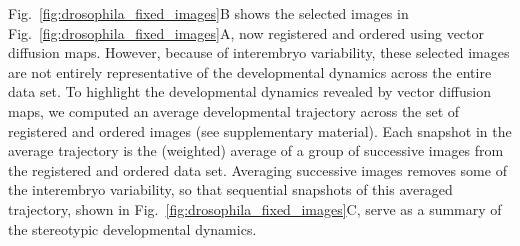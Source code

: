 \documentclass[twocolumn, 10pt]{article}
\newcommand{\SI}[0]{supplementary material}
\newcommand{\fig}[0]{Fig.}
\begin{document}
\fig~\ref{fig:drosophila_fixed_images}B shows the selected images in \fig~\ref{fig:drosophila_fixed_images}A, now registered and ordered using vector diffusion maps.
%
However, because of interembryo variability, these selected images are not entirely representative of the developmental dynamics across the entire data set.
%
To highlight the developmental dynamics revealed by vector diffusion maps, we computed an average developmental trajectory across the set of registered and ordered images (see \SI).
%
Each snapshot in the average trajectory is the (weighted) average of a group of successive images from the registered and ordered data set.
%
Averaging successive images removes some of the interembryo variability, so that sequential snapshots of this averaged trajectory, shown in \fig~\ref{fig:drosophila_fixed_images}C, serve as a summary of the stereotypic developmental dynamics.
\end{document}
